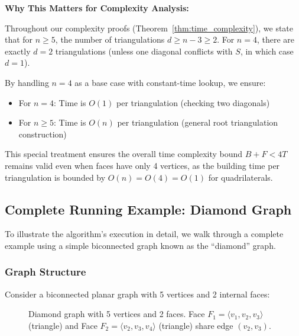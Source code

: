 \documentclass[12pt,a4paper]{article}
\theoremstyle{definition}
\theoremstyle{remark}
\begin{document}
\textbf{Why This Matters for Complexity Analysis:}

Throughout our complexity proofs (Theorem~\ref{thm:time_complexity}), we state that for $n \geq 5$, the number of triangulations $d \geq n - 3 \geq 2$. For $n = 4$, there are exactly $d = 2$ triangulations (unless one diagonal conflicts with $S$, in which case $d = 1$).

By handling $n = 4$ as a base case with constant-time lookup, we ensure:

\begin{itemize}
    \item For $n = 4$: Time is $O(1)$ per triangulation (checking two diagonals)
    \item For $n \geq 5$: Time is $O(n)$ per triangulation (general root triangulation construction)
\end{itemize}

This special treatment ensures the overall time complexity bound $B + F < 4T$ remains valid even when faces have only 4 vertices, as the building time per triangulation is bounded by $O(n) = O(4) = O(1)$ for quadrilaterals.

\subsection{Complete Running Example: Diamond Graph}
\label{sec:running_example}

To illustrate the algorithm's execution in detail, we walk through a complete example using a simple biconnected graph known as the ``diamond'' graph.

\subsubsection{Graph Structure}

Consider a biconnected planar graph with 5 vertices and 2 internal faces:

\begin{figure}[H]
\centering
{}
\caption{Diamond graph with 5 vertices and 2 faces. Face $F_1 = \langle v_1, v_2, v_3 \rangle$ (triangle) and Face $F_2 = \langle v_2, v_3, v_4 \rangle$ (triangle) share edge $(v_2, v_3)$.}
\label{fig:diamond_graph}
\end{figure}
\end{document}
